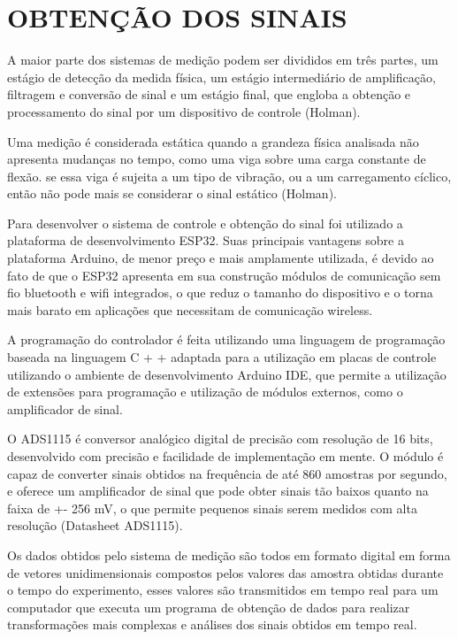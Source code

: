 \section{OBTENÇÃO DOS SINAIS}

A maior parte dos sistemas de medição podem ser divididos em três partes, um estágio de  detecção da medida física, um estágio intermediário de amplificação, filtragem e conversão de sinal e um estágio final, que engloba a obtenção e processamento do sinal por um dispositivo de controle (Holman).

Uma medição é considerada estática quando a grandeza física analisada não apresenta mudanças no tempo, como uma viga sobre uma carga constante de flexão. se essa viga é sujeita a um tipo de vibração, ou a um carregamento cíclico, então não pode mais se considerar o sinal estático (Holman).

Para desenvolver o sistema de controle e obtenção do sinal foi utilizado a plataforma de desenvolvimento ESP32. Suas principais vantagens sobre a plataforma Arduino, de menor preço e mais amplamente utilizada, é devido ao fato de que o ESP32 apresenta em sua construção módulos de comunicação sem fio bluetooth e wifi integrados, o que reduz o tamanho do dispositivo e o torna mais barato em aplicações que necessitam de comunicação wireless.

A programação do controlador é feita utilizando uma linguagem de programação baseada na linguagem C + + adaptada para a utilização em placas de controle utilizando o ambiente de desenvolvimento Arduino IDE, que permite a utilização de extensões para programação e utilização de módulos externos, como o amplificador de sinal.

O ADS1115 é conversor analógico digital de precisão com resolução de 16 bits, desenvolvido com precisão e facilidade de implementação em mente. O módulo é capaz de converter sinais obtidos na frequência de até 860 amostras por segundo, e oferece um amplificador de sinal que pode obter sinais tão baixos quanto na faixa de +- 256 mV, o que permite pequenos sinais serem medidos com alta resolução (Datasheet ADS1115).

Os dados obtidos pelo sistema de medição são todos em formato digital em forma de vetores unidimensionais compostos pelos valores das amostra obtidas durante o  tempo do experimento, esses valores são transmitidos em tempo real para um computador que executa um programa de obtenção de dados para realizar transformações mais complexas e análises dos sinais obtidos em tempo real.

